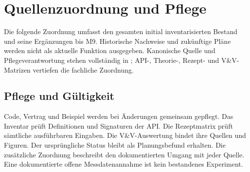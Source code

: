 \chapter{Quellenzuordnung und Pflege}
\label{doc:sources}
Die folgende Zuordnung umfasst den gesamten initial inventarisierten Bestand und seine Ergänzungen bis M9. Historische Nachweise und zukünftige Pläne werden nicht als aktuelle Funktion ausgegeben. Kanonische Quelle und Pflegeverantwortung stehen vollständig in ; API-, Theorie-, Rezept- und V\&V-Matrizen vertiefen die fachliche Zuordnung.
\section{Pflege und Gültigkeit}
Code, Vertrag und Beispiel werden bei Änderungen gemeinsam gepflegt. Das Inventar prüft Definitionen und Signaturen der API. Die Rezeptmatrix prüft sämtliche ausführbaren Eingaben. Die V\&V-Auswertung bindet ihre Quellen und Figuren. Der ursprüngliche Status bleibt als Planungsbefund erhalten. Die zusätzliche Zuordnung beschreibt den dokumentierten Umgang mit jeder Quelle. Eine dokumentierte offene Messdatenannahme ist kein bestandenes Experiment.
